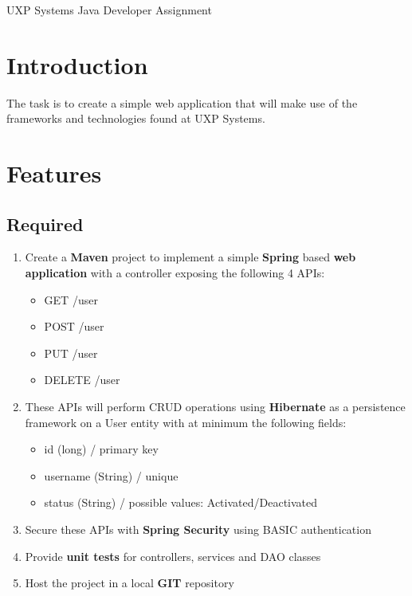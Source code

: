 \documentclass[12pt, onecolumn]{article}
\begin{document}
\vspace*{-75px}
\begingroup  
\centering
\LARGE UXP Systems Java Developer Assignment\\[1.5em]
\endgroup
\section{Introduction}
The task is to create a simple web application that will make use of the frameworks and technologies found at UXP Systems.

\section{Features}
\subsection{Required}
\begin{enumerate}
\item Create a \textbf{Maven} project to implement a simple \textbf{Spring} based \textbf{web application} with a controller exposing the following 4 APIs:
\begin{itemize}
	\item GET  /user
	\item POST /user
	\item PUT /user
	\item DELETE /user
\end{itemize}
\item These APIs will perform CRUD operations using \textbf{Hibernate} as a persistence framework on a User entity with at minimum the following fields:
\begin{itemize}
	\item id (long) / primary key
	\item username (String) / unique
	\item status (String)  / possible values: Activated/Deactivated
\end{itemize}
\item Secure these APIs with \textbf{Spring Security} using BASIC authentication
\item Provide \textbf{unit tests} for controllers, services and DAO classes
\item Host the project in a local \textbf{GIT} repository 
\end{enumerate}
\end{document}
